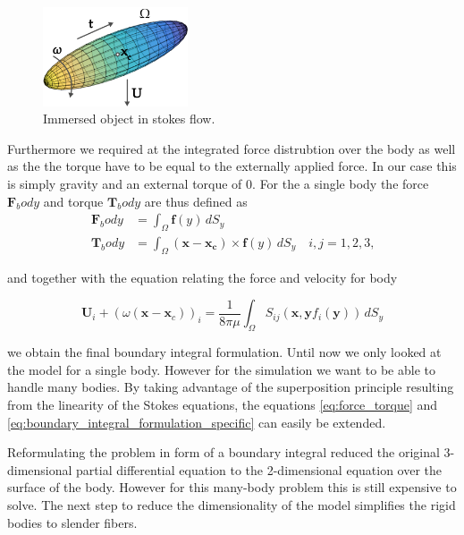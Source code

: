 \documentclass[a4paper,11pt]{kth-mag}
\begin{document}
\begin{figure}[!htbp]
  \centering
  \includegraphics[width=0.3819660112501450000000\textwidth]{img/immersed_rigid.pdf}
  \caption{Immersed object in stokes flow.}
  \label{fig:immersed_rigid}
\end{figure}

Furthermore we required at the integrated force distrubtion over the body as well as the the torque have to be equal to the externally applied force. In our case this is simply gravity and an external torque of $0$. For the a single body the force $\mathbf{F}_body$ and torque $\mathbf{T}_body$ are thus defined as
\begin{equation}
  \label{eq:force_torque}
  \begin{aligned}
    \mathbf{F}_body &= \int_\Omega \mathbf{f}(y) \, dS_y \\
    \mathbf{T}_body &= \int_\Omega (\mathbf{x} - \mathbf{x_c}) \times \mathbf{f}(y) \, dS_y \quad i,j=1,2,3\text{,}
  \end{aligned}
\end{equation}

and together with the equation relating the force and velocity for body

\begin{equation}
  \label{eq:boundary_integral_formulation_specific}
  \mathbf{U}_i + (\omega (\mathbf{x} - \mathbf{x}_c))_i = \frac{1}{8\pi\mu} \int_\Omega S_{ij}(\mathbf{x},\mathbf{y} f_i(\mathbf{y}))  \, dS_y
\end{equation}

we obtain the final boundary integral formulation. Until now we only looked at the model for a single body. However for the simulation we want to be able to handle many bodies. By taking advantage of the superposition principle resulting from the linearity of the Stokes equations, the equations \eqref{eq:force_torque} and \eqref{eq:boundary_integral_formulation_specific} can easily be extended.

Reformulating the problem in form of a boundary integral reduced the original 3-dimensional partial differential equation to the 2-dimensional equation over the surface of the body. However for this many-body problem this is still expensive to solve. The next step to reduce the dimensionality of the model simplifies the rigid bodies to slender fibers.
\end{document}
